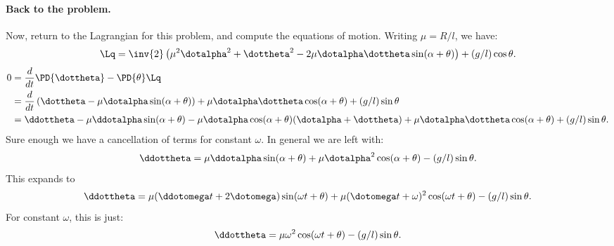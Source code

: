 {\paragraph{Back to the problem.}
%
Now, return to the Lagrangian for this problem, and compute the equations of motion.  Writing \(\mu = R/l\), we have:
%
\begin{equation}\label{eqn:tongMf1:1640}
\Lq = \inv{2} \left( \mu^2 \dotalpha^2 + \dottheta^2 - 2 \mu \dotalpha \dottheta \sin( \alpha +\theta ) \right) + (g/l) \cos\theta.
\end{equation}
%
\begin{equation}\label{eqn:tongMf1:580}
\begin{aligned}
0 &= \frac{d}{dt}\PD{\dottheta} -\PD{\theta} \Lq \\
&= \frac{d}{dt} \left(\dottheta - \mu \dotalpha \sin(\alpha + \theta)\right) + \mu \dotalpha \dottheta \cos(\alpha + \theta) + (g/l) \sin\theta \\
&= \ddottheta - \mu \ddotalpha \sin(\alpha + \theta) - \mu \dotalpha \cos(\alpha + \theta) (\dotalpha + \dottheta) + \mu \dotalpha \dottheta \cos(\alpha + \theta) + (g/l) \sin\theta .
\end{aligned}
\end{equation}
%
Sure enough we have a cancellation of terms for constant \(\omega\).  In general we are left with:
%
\begin{equation}\label{eqn:tongMf1:1660}
\ddottheta = \mu \ddotalpha \sin(\alpha + \theta) + \mu \dotalpha^2 \cos(\alpha + \theta) - (g/l) \sin\theta.
\end{equation}
%
This expands to
\begin{equation}\label{eqn:tongMf1:1680}
\ddottheta = \mu (\ddotomega t + 2\dotomega) \sin(\omega t + \theta) + \mu (\dotomega t + \omega)^2 \cos(\omega t + \theta) - (g/l) \sin\theta.
\end{equation}
%
For constant \(\omega\), this is just:
\begin{equation}\label{eqn:tongMf1:1700}
\ddottheta = \mu \omega^2 \cos(\omega t + \theta) - (g/l) \sin\theta.
\end{equation}
}
%
